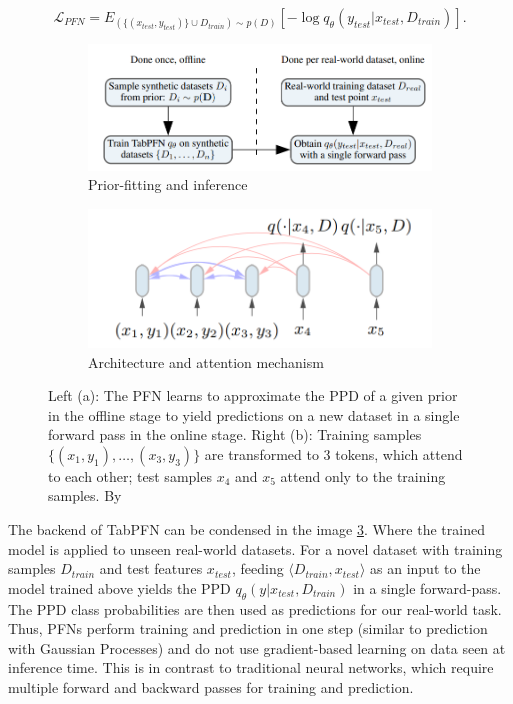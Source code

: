 \documentclass[../main.tex]{subfiles}
\begin{document}
\begin{equation}
    \mathcal{L}_{\textit{PFN}} = E_{(\{(x_{test}, y_{test})\} \cup D_{train}) \sim p(D)} [-\log q_{\theta}(y_{test}|x_{test},D_{train})].
    \label{eq:lpfn}
\end{equation}

\begin{figure}
    \begin{subfigure}{.5\textwidth}
        \centering
        \includegraphics[width=.8\linewidth]{Figure/tabpfn_prior-fitting.png}
        \caption{Prior-fitting and inference}
        \label{fig:pfn_usage}
    \end{subfigure}
    \begin{subfigure}{.5\textwidth}
        \centering
        \includegraphics[width=.8\linewidth]{Figure/tabpfn_baysian_nodes.png}
        \caption{Architecture and attention mechanism}
        \label{fig:transformer_visualization}
    \end{subfigure}
    \caption{Left (a): The \gls{PFN} learns to approximate the \gls{PPD} of a given prior in the offline stage to yield predictions on a new dataset in a single forward pass in the online stage. Right (b): Training samples $\{(x_1,y_1), \dots, (x_3,y_3)\}$ are transformed to $3$ tokens, which attend to each other; test samples $x_4$ and $x_5$ attend only to the training samples. By \citeauthor{tabpfn}}
    \label{fig:pfn_overview}
\end{figure}

The backend of TabPFN can be condensed in the image \ref{fig:pfn_overview}.
Where the trained model is applied to unseen real-world datasets.
For a novel dataset with training samples $D_{train}$ and test features $x_{test}$, feeding $\langle{}D_{train},x_{test}\rangle$ as an input to the model trained above yields the \gls{PPD} $q_{\theta}(y|x_{test},D_{train})$ in a single forward-pass.
The \gls{PPD} class probabilities are then used as predictions for our real-world task.
Thus, PFNs perform training and prediction in one step (similar to prediction with Gaussian Processes) and do not use gradient-based learning on data seen at inference time.
This is in contrast to traditional neural networks, which require multiple forward and backward passes for training and prediction.
\end{document}
